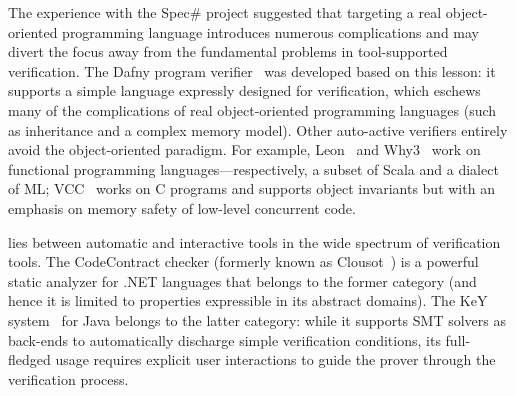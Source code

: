 The experience with the Spec\# project suggested that targeting a real object-oriented programming language introduces numerous complications and may divert the focus away from the fundamental problems in tool-supported verification.
The Dafny program verifier~\cite{LEINO10} was developed based on this lesson: it supports a simple language expressly designed for verification, which eschews many of the complications of real object-oriented programming languages (such as inheritance and a complex memory model). 
Other auto-active verifiers entirely avoid the object-oriented paradigm.
For example, Leon~\cite{SUTER11} and Why3~\cite{BOBOT11,FILLIATRE13} work on functional programming languages---respectively, a subset of Scala and a dialect of ML; VCC~\cite{COHEN09} works on C programs and supports object invariants but with an emphasis on memory safety of low-level concurrent code.

\AutoProof lies between automatic and interactive tools in the wide spectrum of verification tools.
The CodeContract checker (formerly known as Clousot~\cite{LOGOZZO12}) is a powerful static analyzer for .NET languages that belongs to the former category (and hence it is limited to properties expressible in its abstract domains).
The KeY system~\cite{BECKERT07} for Java belongs to the latter category: while it supports SMT solvers as back-ends to automatically discharge simple verification conditions, its full-fledged usage requires explicit user interactions to guide the prover through the verification process.





